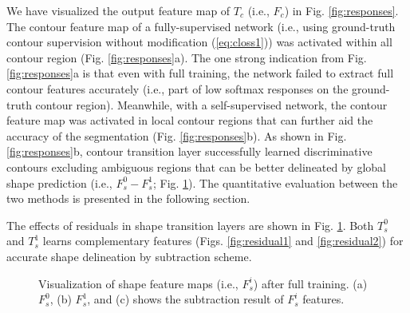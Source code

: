 \documentclass[journal]{IEEEtran}
\begin{document}
We have visualized the output feature map of $T_c$ (i.e., $F_c$) in Fig. \ref{fig:responses}. The contour feature map of a fully-supervised network (i.e., using ground-truth contour supervision without modification (\ref{eq:closs1})) was activated within all contour region (Fig. \ref{fig:responses}a). The one strong indication from Fig. \ref{fig:responses}a is that even with full training, the network failed to extract full contour features accurately (i.e., part of low softmax responses on the ground-truth contour region). Meanwhile, with a self-supervised network, the contour feature map was activated in local contour regions that can further aid the accuracy of the segmentation (Fig. \ref{fig:responses}b). As shown in Fig. \ref{fig:responses}b, contour transition layer successfully learned discriminative contours excluding ambiguous regions that can be better delineated by global shape prediction (i.e., $F^0_s-F^1_s$; Fig. \ref{fig:residuals}). The quantitative evaluation between the two methods is presented in the following section.\par
The effects of residuals in shape transition layers are shown in Fig. \ref{fig:residuals}. Both \(T^0_s\) and \(T^1_s\) learns complementary features (Figs. \ref{fig:residual1} and \ref{fig:residual2}) for accurate shape delineation by subtraction scheme.


\begin{figure}[!tb]
    
    \centering
        \hfil
        \hfil
    \caption{Visualization of shape feature maps (i.e., \(F^i_s\)) after full training. (a) \(F^0_s\), (b) \(F^1_s\), and (c) shows the subtraction result of \(F^i_s\) features.}
    \label{fig:residuals}
\end{figure}
\end{document}
